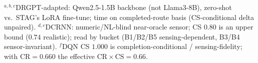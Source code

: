 \begin{table}[t]
\vspace{1pt}
{\scriptsize\raggedright
$^{a,b,c}$DRGPT-adapted: Qwen2.5-1.5B backbone (not Llama3-8B), zero-shot vs.\ STAG's LoRA fine-tune; time on completed-route basis (CS-conditional delta unpaired).
$^{d,e}$DCRNN: numeric/NL-blind near-oracle sensor; CS $0.80$ is an upper bound ($0.74$ realistic); read by bucket (B1/B2/B5 sensing-dependent, B3/B4 sensor-invariant).
$^{f}$DQN CS $1.000$ is completion-conditional / sensing-fidelity; with CR${=}0.660$ the effective $\mathrm{CR}{\times}\mathrm{CS}{=}0.66$.\par}
\end{table}


